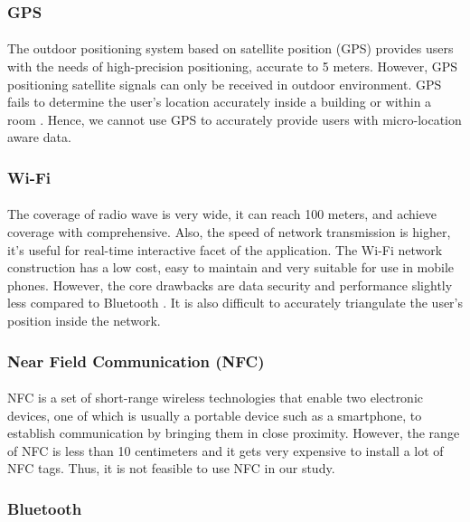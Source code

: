 \documentclass[12pt]{article}
\begin{document}
\subsubsection{GPS}
\paragraph{} The outdoor positioning system based on satellite position (GPS) provides users with the needs of high-precision positioning, accurate to 5 meters. However, GPS positioning satellite signals can only be received in outdoor environment. GPS fails to determine the user's location accurately inside a building or within a room \cite{indoor}. Hence, we cannot use GPS to accurately provide users with micro-location aware data.

\subsubsection{Wi-Fi}
\paragraph{} The coverage of radio wave is very wide, it can reach 100 meters, and achieve coverage with comprehensive. Also, the speed of network transmission is higher, it’s useful for real-time interactive facet of the application. The Wi-Fi network construction has a low cost, easy to maintain and very suitable for use in mobile phones. However, the core drawbacks are data security and performance slightly less compared to Bluetooth \cite{indoor}. It is also difficult to accurately triangulate the user's position inside the network.

\subsubsection{Near Field Communication (NFC)}
\paragraph{}NFC is a set of short-range wireless technologies that enable two electronic devices, one of which is usually a portable device such as a smartphone, to establish communication by bringing them in close proximity. However, the range  of NFC is less than 10 centimeters and it gets very expensive to install a lot of NFC tags. Thus, it is not feasible to use NFC in our study.

\subsubsection{Bluetooth}
\end{document}
